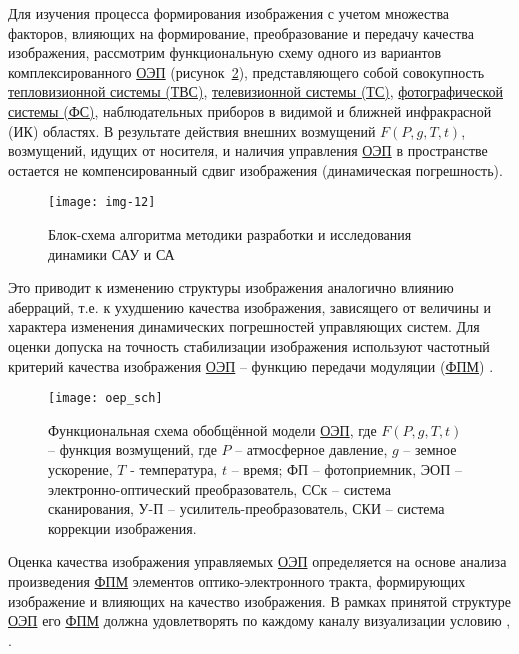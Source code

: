 Для изучения процесса формирования изображения с учетом множества факторов, влияющих на формирование, преобразование и передачу качества изображения, рассмотрим функциональную схему одного из вариантов комплексированного \hyperref[acroEOS]{ОЭП} (рисунок~\ref{fig:oep_sch}), представляющего собой совокупность \hyperref[acroTVS]{тепловизионной системы (ТВС)}, \hyperref[acroTS]{телевизионной системы (ТС)}, \hyperref[acroFS]{фотографической системы (ФС)}, наблюдательных приборов в видимой и ближней инфракрасной (ИК) областях. В результате действия внешних возмущений $F(P,g,T,t)$, возмущений, идущих от носителя, и наличия управления \hyperref[acroEOS]{ОЭП} в пространстве остается не компенсированный сдвиг изображения (динамическая погрешность).

\begin{figure}[ht]
	\centering
	\texttt{[image: img-12]} 
	\caption{Блок-схема алгоритма методики разработки и исследования динамики САУ и СА}
	\label{fig:tikz_example}
\end{figure}

\newpage
Это приводит к изменению структуры изображения аналогично влиянию аберраций, т.е. к ухудшению качества изображения, зависящего от величины и характера изменения динамических погрешностей управляющих систем. Для оценки допуска на точность стабилизации изображения используют частотный критерий качества изображения \hyperref[acroEOS]{ОЭП} – функцию передачи модуляции (\hyperref[acroFPM]{ФПМ}) \cite[]{Tarasov}.

\begin{figure}[ht]
	\centering
	\texttt{[image: oep\_sch]} 
	\caption{Функциональная схема обобщённой модели \hyperref[acroEOS]{ОЭП}, где $F(P,g,T,t)$ – функция возмущений, где $P$ – атмосферное давление, $g$ – земное ускорение, $T$ - температура, $t$ – время; ФП – фотоприемник, ЭОП – электронно-оптический преобразователь, ССк – система сканирования, У-П – усилитель-преобразователь, СКИ – система коррекции изображения.}
	\label{fig:oep_sch}
\end{figure}

Оценка качества изображения управляемых \hyperref[acroEOS]{ОЭП} определяется на основе анализа произведения \hyperref[acroFPM]{ФПМ} элементов оптико-электронного тракта, формирующих изображение и влияющих на качество изображения. В рамках принятой структуре \hyperref[acroEOS]{ОЭП} его \hyperref[acroFPM]{ФПМ} должна удовлетворять по каждому каналу визуализации условию \cite[]{Ivanov18}, \cite[]{Molin21}.

